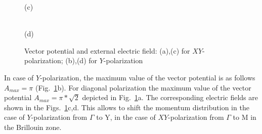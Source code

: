 \begin{figure}[h!]
\begin{minipage}[h]{0.5\linewidth}
\end{minipage}
\begin{minipage}[h]{0.5\linewidth}
 (c) \\
\end{minipage}
\hfill
\begin{minipage}[h]{0.5\linewidth}
 \\(d)
\end{minipage}
\caption{Vector potential and external electric field: (a),(c) for $XY$-polarization; (b),(d) for $Y$-polarization}
\label{fig:Pulses}
\end{figure}
In case of $Y$-polarization, the maximum value of the vector potential is as follows $A_{max} = \pi$ (Fig.~\ref{fig:Pulses}b). For diagonal polarization the maximum value of the vector potential $A_{max} =\pi*\sqrt{2}$ depicted in Fig.~\ref{fig:Pulses}a. The corresponding electric fields are shown in the Figs.~\ref{fig:Pulses}c,d. This allows to shift the momentum distribution in the case of $Y$-polarization from $\Gamma$ to Y, in the case of $XY$-polarization from $\Gamma$ to M in the Brillouin zone.

